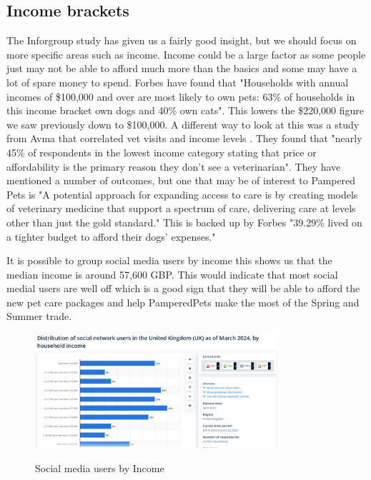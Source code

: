 \documentclass{article}
\begin{document}
\subsection{Income brackets}
The Inforgroup study \cite{data} has given us a fairly good insight, but we should focus on more specific areas such as income. Income could be a large factor as some people just may not be able to afford much more than the basics and some may have a lot of spare money to spend.
Forbes \cite{forbes} have found that "Households with annual incomes of \$100,000 and over are most likely to own pets: 63\% of households in this income bracket own dogs and 40\% own cats". This lowers the \$220,000 figure we saw previously down to \$100,000.
A different way to look at this was a study from Avma that correlated vet visits and income levels \cite{avma}. They found that "nearly 45\% of respondents in the lowest income category stating that price or affordability is the primary reason they don't see a veterinarian". They have mentioned a number of outcomes, but one that may be of interest to Pampered Pets is "A potential approach for expanding access to care is by creating models of veterinary medicine that support a spectrum of care, delivering care at levels other than just the gold standard." This is backed up by Forbes "39.29\% lived on a tighter budget to afford their dogs' expenses." \cite{forbes}

It is possible to group social media users by income \cite{income} this shows us that the median income is around 57,600 GBP. This would indicate that most social medial users are well off which is a good sign that they will be able to afford the new pet care packages and help PamperedPets make the most of the Spring and Summer trade.

\FloatBarrier
\begin{figure}[ht]
    \caption{Social media users by Income}
    \centering
    \includegraphics[width=0.8\textwidth]{Income}
    \label{fig:pets}
    \end{figure}
    \FloatBarrier
\end{document}
